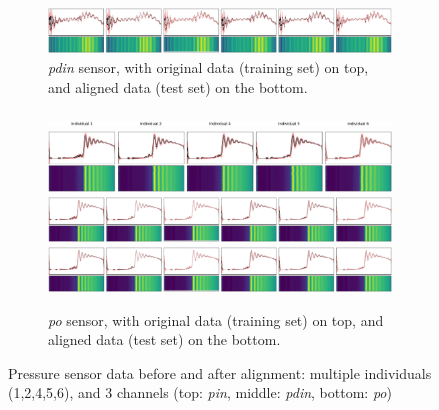 \begin{figure}[!htb]
\begin{center}
\begin{subfigure}{\linewidth}
        \includegraphics[height=0.159\linewidth,trim=675 0 0 0,clip]{figures/aligned/plot_heatmap_class_1_3.jpg}
        \caption{\textit{pdin} sensor, with original data (training set) on top, and aligned data (test set) on the bottom.}
    \end{subfigure}
    \begin{subfigure}{\linewidth}
        \includegraphics[width=\linewidth]{figures/original/plot_heatmap_class_1_1.jpg}
        \includegraphics[width=\linewidth]{figures/original/plot_heatmap_class_1_4.jpg}
        \includegraphics[height=0.159\linewidth,trim=0 0 900 0,clip]{figures/aligned/plot_heatmap_class_1_4.jpg}
        \includegraphics[height=0.159\linewidth,trim=675 0 0 0,clip]{figures/aligned/plot_heatmap_class_1_4.jpg}
        \caption{\textit{po} sensor, with original data (training set) on top, and aligned data (test set) on the bottom.}
    \end{subfigure}
    \caption{Pressure sensor data before and after alignment: multiple individuals (1,2,4,5,6), and 3 channels (top: \textit{pin}, middle: \textit{pdin}, bottom: \textit{po})}
    \label{fig:phm_alignment_2}
    \end{center}
\end{figure}

